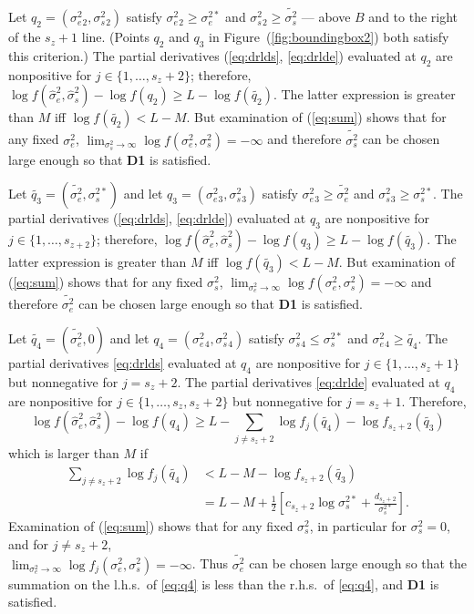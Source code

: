 \documentclass{report}
\newcommand{\RL}{f}
\newcommand{\logRL}{\log\RL}
\newcommand{\sigssq}{\sigma_s^2}
\newcommand{\sigesq}{\sigma_e^2}
\newcommand{\sshat}{\hat\sigma^2_e,\hat\sigma^2_s}
\newcommand{\logRLss}{\logRL(\sigesq,\sigssq)}
\begin{document}
Let $q_2 = (\sigesq{}_2, \sigssq{}_2)$ satisfy $\sigesq{}_2 \ge \sigma_e^{2*}$ and $\sigssq{}_2 \ge \widetilde{\sigma_s^2}$ --- above $B$ and to the right of the $s_z+1$ line.  (Points $q_2$ and $q_3$ in Figure~(\ref{fig:boundingbox2}) both satisfy this criterion.)  The partial derivatives (\ref{eq:drlds}, \ref{eq:drlde}) evaluated at $q_2$ are nonpositive for $j \in \{1, \dots, s_z+2\}$; therefore, $\logRL(\sshat) - \logRL(q_2) \ge L - \logRL(\widetilde{q_2})$.  The latter expression is greater than $M$ iff $\logRL(\widetilde{q_2}) < L-M$.  But examination of (\ref{eq:sum}) shows that for any fixed $\sigesq$, $\lim_{\sigssq \rightarrow \infty} \logRLss = -\infty$ and therefore $\widetilde{\sigma_s^2}$ can be chosen large enough so that \textbf{D1} is satisfied.

Let $\widetilde{q_3} = (\widetilde{\sigma_e^2}, \sigma_s^{2*})$ and let $q_3 = (\sigesq{}_3, \sigssq{}_3)$ satisfy $\sigesq{}_3 \ge \widetilde{\sigma_e^2}$ and $\sigssq{}_3 \ge \sigma_s^{2*}$.  The partial derivatives (\ref{eq:drlds}, \ref{eq:drlde}) evaluated at $q_3$ are nonpositive for $j \in \{1, \dots, s_{z+2}\}$; therefore, $\logRL(\sshat) - \logRL(q_3) \ge L - \logRL(\widetilde{q_3})$.  The latter expression is greater than $M$ iff $\logRL(\widetilde{q_3}) < L-M$.  But examination of (\ref{eq:sum}) shows that for any fixed $\sigssq$, $\lim_{\sigesq \rightarrow \infty} \logRLss = -\infty$ and therefore $\widetilde{\sigma_e^2}$ can be chosen large enough so that \textbf{D1} is satisfied.

Let $\widetilde{q_4} = (\widetilde{\sigma_e^2},0)$ and let $q_4 = (\sigesq{}_4, \sigssq{}_4)$ satisfy $\sigssq{}_4 \le \sigma_s^{2*}$ and $\sigesq{}_4 \ge \widetilde{q_4}$.  The partial derivatives \eqref{eq:drlds} evaluated at $q_4$ are nonpositive for $j \in \{1, \dots, s_z+1\}$  but nonnegative for $j=s_z+2$.  The partial derivatives \eqref{eq:drlde} evaluated at $q_4$ are nonpositive for $j \in \{1, \dots, s_z, s_z+2\}$  but nonnegative for $j=s_z+1$. Therefore,
\begin{equation*}
	\logRL(\sshat) - \logRL(q_4) \ge L - \sum_{j \ne s_z+2} \logRL_j(\widetilde{q_4}) - \logRL_{s_z+2}(\widetilde{q_3})
\end{equation*}
which is larger than $M$ if
\begin{equation}
\label{eq:q4}
  \begin{split}
    \sum_{j \ne s_z+2} \logRL_j(\widetilde{q_4})
      &< L - M - \logRL_{s_z+2}(\widetilde{q_3})\\
      &= L - M + \frac{1}{2} \left[ c_{s_z+2}\log\sigma_s^{2*} + \frac{d_{s_z+2}}{\sigma_s^{2*}}\right].
  \end{split}
\end{equation}
Examination of (\ref{eq:sum}) shows that for any fixed $\sigssq$, in particular for $\sigssq=0$, and for $j \ne s_z+2$,\\ $\lim_{\sigesq \rightarrow \infty} \logRL_j(\sigesq,\sigssq) = -\infty$.  Thus $\widetilde{\sigma_e^2}$ can be chosen large enough so that the summation on the l.h.s.~of \eqref{eq:q4} is less than the r.h.s.~of \eqref{eq:q4}, and  \textbf{D1} is satisfied.
\end{document}
